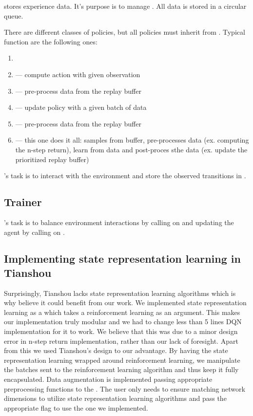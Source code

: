  stores experience data.
It's purpose is to manage .
All data is stored in a circular queue.


There are different classes of policies, but all policies must inherit from .
Typical function are the following ones:
\begin{enumerate}
		\item {}
		\item {} --- compute action with given observation
		\item {} --- pre-process data from the replay buffer
		\item {} --- update policy with a given batch of data
		\item {} --- pre-process data from the replay buffer
		\item {} --- this one does it all: samples from buffer,
				pre-processes data (ex. computing the n-step return),
				learn from data and post-proces sthe data (ex. update the prioritized replay buffer)
\end{enumerate}


's task is to interact with the environment
and store the observed transitions in .
\subsection{Trainer}'s task is to balance environment interactions by calling on 
and updating the agent by calling on .


\subsection{Implementing state representation learning in Tianshou}
Surprisingly, Tianshou lacks state representation learning algorithms
which is why believe it could benefit from our work.
We implemented state representation learning as a 
which takes a reinforcement learning  as an argument.
This makes our implementation truly modular and we had to change less than 5 lines 
DQN implementation for it to work. We believe that this was due to a minor design
error in n-step return implementation, rather than our lack of foresight.
Apart from this we used Tianshou's design to our advantage.
By having the state representation learning wrapped around reinforcement learning,
we manipulate the batches sent to the reinforcement learning algorithm
and thus keep it fully encapsulated.
Data augmentation is implemented passing appropriate 
preprocessing functions to the .
The user only needs to ensure matching network dimensions to utilize 
state representation learning algorithms and pass the appropriate flag
to use the one we implemented.


